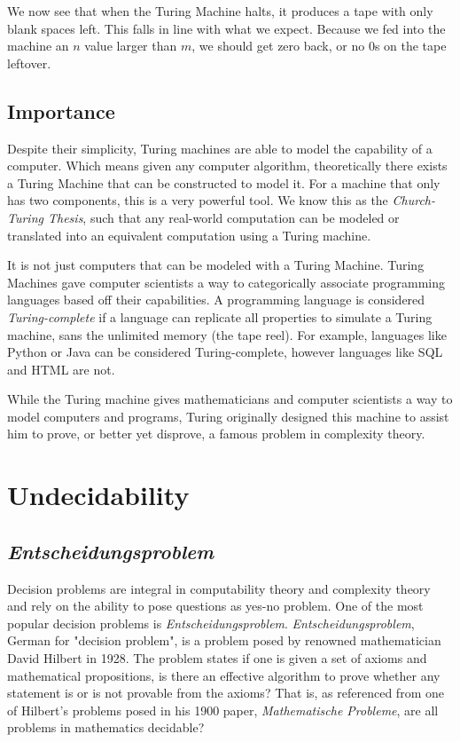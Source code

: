 \documentclass[12pt]{article}
\begin{document}
\noindent We now see that when the Turing Machine halts, it produces a tape with only blank spaces left. This falls in line with what we expect. Because we fed into the machine an $n$ value larger than $m$, we should get zero back, or no $0$s on the tape leftover.


\subsection{Importance}

Despite their simplicity, Turing machines are able to model the capability of a computer. Which means given any computer algorithm, theoretically there exists a Turing Machine that can be constructed to model it. For a machine that only has two components, this is a very powerful tool. We know this as the \textit{Church-Turing Thesis}, such that any real-world computation can be modeled or translated into an equivalent computation using a Turing machine.

It is not just computers that can be modeled with a Turing Machine. Turing Machines gave computer scientists a way to categorically associate programming languages based off their capabilities. A programming language is considered \textit{Turing-complete} if a language can replicate all properties to simulate a Turing machine, sans the unlimited memory (the tape reel). For example, languages like Python or Java can be considered Turing-complete, however languages like SQL and HTML are not.

While the Turing machine gives mathematicians and computer scientists a way to model computers and programs, Turing originally designed this machine to assist him to prove, or better yet disprove, a famous problem in complexity theory.


\section{Undecidability}

\subsection{\textit{Entscheidungsproblem}}

Decision problems are integral in computability theory and complexity theory and rely on the ability to pose questions as yes-no problem. One of the most popular decision problems is \textit{Entscheidungsproblem}. \textit{Entscheidungsproblem}, German for "decision problem", is a problem posed by renowned mathematician David Hilbert in 1928. The problem states if one is given a set of axioms and mathematical propositions, is there an effective algorithm to prove whether any statement is or is not provable from the axioms? That is, as referenced from one of Hilbert's problems posed in his 1900 paper, \textit{Mathematische Probleme}, are all problems in mathematics decidable?
\end{document}
